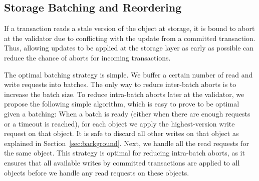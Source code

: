 \subsection{Storage Batching and Reordering}
If a transaction reads a stale version of the object at storage, it is bound to abort at the validator due to conflicting with the update from a committed transaction. Thus, allowing updates to be applied at the storage layer as early as possible can reduce the chance of aborts for incoming transactions.

The optimal batching strategy is simple. We buffer a certain number of read and write requests into batches. The only way to reduce inter-batch aborts is to increase the batch size. To reduce intra-batch aborts later at the validator, we propose the following simple algorithm, which is easy to prove to be optimal given a batching:  When a batch is ready (either when there are enough requests or a timeout is reached), for each object we apply the highest-version write request on that object. It is safe to discard all other writes on that object as explained in Section~\ref{sec:background}. Next, we handle all the read requests for the same object. This strategy is optimal for reducing intra-batch aborts, as it ensures that all available writes by committed transactions are applied to all objects before we handle any read requests on these objects. 



